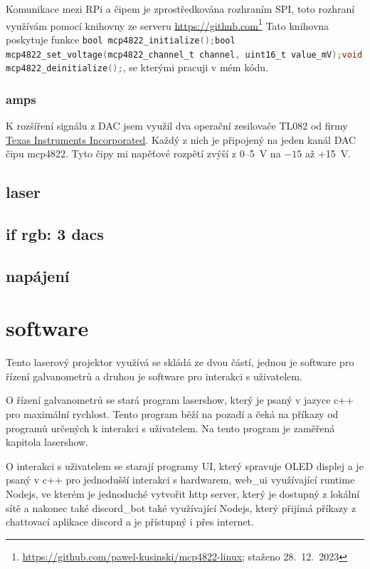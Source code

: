 \documentclass{template/socthesis}
\begin{document}
Komunikace mezi RPi a čipem je zprostředkována rozhraním SPI, toto rozhraní využívám pomocí knihovny ze serveru \url{https://github.com}\footnote{\url{https://github.com/pawel-kusinski/mcp4822-linux}; staženo 28.~12.~2023}  
Tato knihovna poskytuje funkce \lstinline[language=C]!bool mcp4822_initialize();bool mcp4822_set_voltage(mcp4822_channel_t channel, uint16_t value_mV);void mcp4822_deinitialize();!, se kterými pracuji v mém kódu.
\subsection{amps}
K rozšíření signálu z DAC jsem využil dva operační zesilovače TL082 od firmy \href{https://www.ti.com/}{Texas Instruments Incorporated}. Každý z nich je připojený na jeden kanál DAC čipu mcp4822.
Tyto čipy mi napěťové rozpětí zvýší z 0--5~V na $-15$ až +15~V.

\section{laser}
\section{if rgb: 3 dacs}



\section{napájení}

\chapter{software}
Tento laserový projektor využívá se skládá ze dvou částí, jednou je software pro řízení galvanometrů a druhou je software pro interakci s uživatelem.

O řízení galvanometrů se stará program lasershow, který je psaný v jazyce c++ pro maximální rychlost. Tento program běží na pozadí a čeká na příkazy od programů určených k interakci s uživatelem. Na tento program je zaměřená kapitola lasershow. 

O interakci s uživatelem se starají programy UI, který spravuje OLED displej a je psaný v c++ pro jednodušší interakci s hardwarem, web\_ui využívající runtime Nodejs, ve kterém je jednoduché vytvořit http server, který je dostupný z lokální sítě a nakonec také discord\_bot také využívající Nodejs, který přijímá příkazy z chattovací aplikace discord a je přístupný i přes internet.
\end{document}
